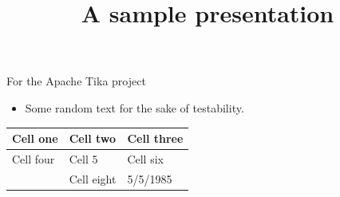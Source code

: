 \documentclass[11pt,a4paper]{article}
\title{A sample presentation}
\begin{document}
\maketitle

For the Apache Tika project

\begin{itemize}
\item Some random text for the sake of testability.
\end{itemize}

\begin{table}[h]
\begin{tabular}{|l|l|l|}
\hline
Cell one & Cell two & Cell three \\ \hline
Cell four & Cell 5 & Cell six \\ \hline
 & Cell eight & 5/5/1985 \\ \hline
\end{tabular}
\end{table}
\end{document}
